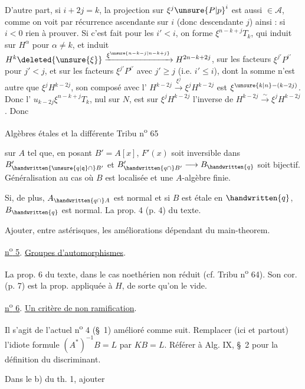 D'autre part, si $i+2j=k$, la projection sur
$\xi^j\unsure{P|p}^{i}$ est aussi $\in\mathcal{A}$, comme on voit 
par récurrence ascendante sur $i$ (donc descendante 
$j$) ainsi : si $i<0$ rien à prouver. Si c'est
fait pour les $i'<i$, on forme
$\xi^{n-k+j}T_k$,  qui induit  sur $H^\alpha$ pour $\alpha\neq k$,
et induit $H^{k}\deleted{\unsure{\xi}}\xrightarrow{\xi^{\unsure{n-k-j|n-k+j}}}H^{2n-k+2j}$, 
sur les facteurs $\xi^{j'}P^{i'}$ pour $j'<j$,  et sur
les facteurs $\xi^{j'}P^{i'}$ avec $j'\geq j$ (i.e. $i'\leq i$),
 dont la somme n'est autre
que $\xi^j H^{k-2j}$, son composé avec l'
$H^{k-2j}\xrightarrow{\xi^{j}}\xi^j H^{k-2j}$ est $\xi^{\unsure{k|n}-(k-2j)}$. Donc l'
$u_{k-2j}\xi^{n-k+j}T_k$\unsure{:|,|;}, nul sur $N$, est sur $\xi^j H^{k-2j}$
l'inverse de $H^{k-2j}\xrightarrow{\sim}\xi^j H^{k-2j}$. Donc

Algèbres étales et la différente \hfill Tribu n\textsuperscript{o} 65

sur $A$ tel que, en posant $B'=A[x]$, $F'(x)$ soit inversible dans $B'_{\handwritten{\unsure{q|\mathfrak{q}}\cap}B'}$ et
$B'_{\handwritten{q\cap}B'}\longrightarrow B_{\handwritten{q}}$ soit bijectif. Généralisation au cas où $B$ est localisée et une
$A$-algèbre finie.

Si, de plus, $A_{\handwritten{q\cap}A}$ est normal et si $B$ est étale en $\handwritten{q}$, $B_{\handwritten{q}}$ est normal.
La prop. 4 (p. 4) du texte.

Ajouter, entre astérisques, les améliorations dépendant du main-theorem.

\uline{n\textsuperscript{o} 5}. \uline{Groupes d'automorphismes}.

La prop. 6 du texte, dans le cas noethérien non réduit (cf. Tribu n\textsuperscript{o} 64). Son cor.
(p. 7) est la prop. appliquée à $H$, de sorte qu'on le vide.

\uline{n\textsuperscript{o} 6}. \uline{Un critère de non ramification}.

Il s'agit de l'actuel n\textsuperscript{o} 4 (\S~1) amélioré comme suit. Remplacer (ici et partout)
l'idiote formule $(A^{*})^{-1}B=L$ par $KB=L$. Référer à Alg. IX, \S~2 pour la définition
du discriminant.

Dans le b) du th. 1, ajouter

